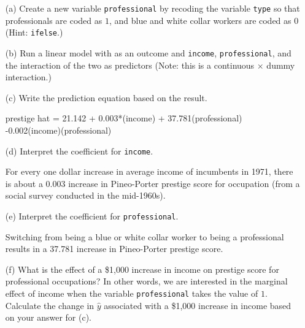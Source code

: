 \documentclass[12pt,letterpaper]{article}
\begin{document}
\newpage
\begin{enumerate}
	
	\item [(a)]
	Create a new variable \texttt{professional} by recoding the variable \texttt{type} so that professionals are coded as $1$, and blue and white collar workers are coded as $0$ (Hint: \texttt{ifelse}.)
	\vspace{1cm}
 
	\vspace{3cm}
	\item [(b)]
	Run a linear model with  as an outcome and \texttt{income}, \texttt{professional}, and the interaction of the two as predictors (Note: this is a continuous $\times$ dummy interaction.)
	\vspace{1cm}
	
\vspace{1cm}
	\item [(c)]
	Write the prediction equation based on the result.
\vspace{1cm}

\noindent prestige hat = 21.142 +  0.003*(income) + 37.781(professional) -0.002(income)(professional) 
	
\newpage
	\item [(d)]
	Interpret the coefficient for \texttt{income}.
\vspace{1cm}

\noindent For every one dollar increase in average income of incumbents in 1971, there is about a 0.003 increase in Pineo-Porter prestige score for occupation (from a social survey conducted in the mid-1960s).
	\vspace{3cm}
		
	\item [(e)]
	Interpret the coefficient for \texttt{professional}.
\vspace{1cm}

\noindent Switching from being a blue or white collar worker to being a professional results in a 37.781 increase in Pineo-Porter prestige score.
	
	\newpage
	\item [(f)]
	What is the effect of a \$1,000 increase in income on prestige score for professional occupations? In other words, we are interested in the marginal effect of income when the variable \texttt{professional} takes the value of $1$. Calculate the change in $\hat{y}$ associated with a \$1,000 increase in income based on your answer for (c).
	\vspace{1cm}

\vspace{1cm}


\end{enumerate}
\end{document}

